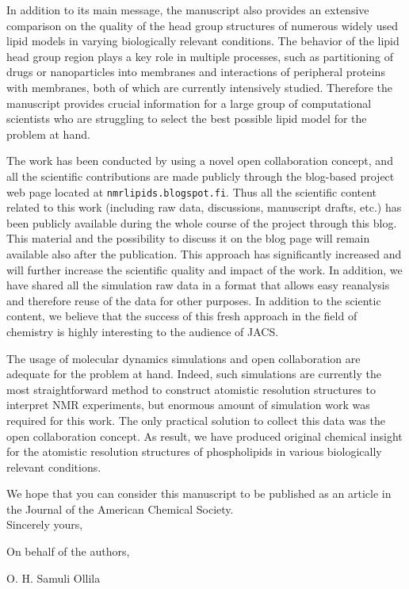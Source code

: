 \documentclass[12pt]{letter}
\begin{document}
In addition to its main message, the manuscript also provides an extensive comparison on the quality of the head group 
structures of numerous widely used lipid models in varying biologically relevant conditions. The behavior
of the lipid head group region plays a key role in multiple processes, such as partitioning of drugs or 
nanoparticles into membranes and interactions of peripheral proteins with membranes, both of which are 
currently intensively studied. Therefore the manuscript provides crucial information for a large group
of computational scientists who are struggling to select the best possible lipid model for the problem at hand.

The work has been conducted by using a novel open collaboration concept, and all the scientific contributions
are made publicly through the blog-based project web page located at \texttt{nmrlipids.blogspot.fi}. 
Thus all the scientific content related to this work (including raw data, discussions, manuscript drafts, etc.)
has been publicly available during the whole course of the project through this blog. This material and the possibility to 
discuss it on the blog page will remain available also after the publication. This approach has significantly 
increased and will further increase the scientific quality and impact of the work. In addition, we have shared 
all the simulation raw data in a format that allows easy reanalysis and therefore reuse of the data for other purposes. 
In addition to the scientic content, we believe that the success of this fresh approach in the field of chemistry 
is highly interesting to the audience of JACS.

The usage of molecular dynamics simulations and open collaboration are adequate for the
problem at hand. Indeed, such simulations are currently the most straightforward method to 
construct atomistic resolution structures to interpret NMR experiments, but
enormous amount of simulation work was required for this work. The only practical
solution to collect this data was the open collaboration concept.
As result, we have produced original chemical insight for the atomistic resolution 
structures of phospholipids in various biologically relevant conditions.

We hope that you can consider this manuscript to be published as an article in the Journal of the American Chemical Society. \\

Sincerely yours,

On behalf of the authors,

O. H. Samuli Ollila
\end{document}
